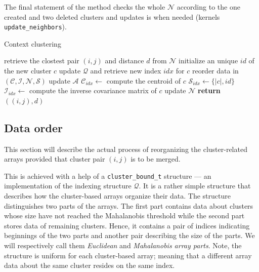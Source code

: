 \begin{description}
	The final statement of the method checks the whole $\mathcal{N}$  according to the one created and two deleted clusters and updates is when needed (kernels \texttt{update\_neighbors}).
	
	\begin{algorithm}
	\caption{Context clustering}
	\label{alg03:context}
	\begin{algorithmic}[1]
		\State retrieve the clostest pair $(i,j)$ and distance $d$ from $\mathcal{N}$
		\State initialize an unique $id$ of the new cluster $c$
		\State update $\mathcal{Q}$ and retrieve new index $idx$ for $c$
		\State reorder data in $(\mathcal{C},\mathcal{I},\mathcal{N},\mathcal{S})$
		\State update $\mathcal{A}$
		\State $\mathcal{C}_{idx} \gets$ compute the centroid of $c$
		\State $\mathcal{S}_{idx} \gets \{|c|, id\}$
		\State $\mathcal{I}_{idx} \gets$ compute the inverse covariance matrix of $c$
		\EndIf
		\State update $\mathcal{N}$
		\State \textbf{return} $((i,j),d)$
		\EndProcedure
	\end{algorithmic}
\end{algorithm}

\end{description}


\subsection{Data order}

This section will describe the actual process of reorganizing the cluster-related arrays provided that cluster pair $(i,j)$ is to be merged.

This is achieved with a help of a \texttt{cluster\_bound\_t} structure --- an implementation of the indexing structure $\mathcal{Q}$. It is a rather simple structure that describes how the cluster-based arrays organize their data. The structure distinguishes two parts of the arrays. The first part contains data about clusters whose size have not reached the Mahalanobis threshold while the second part stores data of remaining clusters. Hence, it contains a pair of indices indicating beginnings of the two parts and another pair describing the size of the parts. We will respectively call them \emph{Euclidean} and \emph{Mahalanobis array parts}. Note, the structure is uniform for each cluster-based array; meaning that a different array data about the same cluster resides on the same index.

